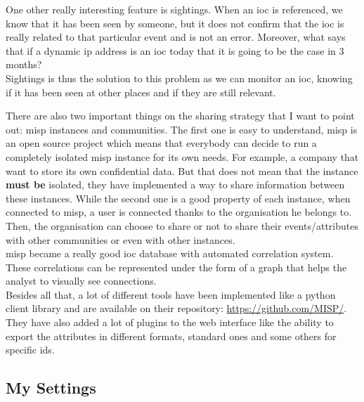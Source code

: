 \documentclass{eplmastersthesis}
\begin{document}
One other really interesting feature is sightings. When an \gls{ioc} is referenced, we know that it has been seen by someone, but it does not confirm that the \gls{ioc} is really related to that particular event and is not an error. Moreover, what says that if a dynamic \gls{ip} address is an \gls{ioc} today that it is going to be the case in 3 months? \\
Sightings is thus the solution to this problem as we can monitor an \gls{ioc}, knowing if it has been seen at other places and if they are still relevant.


There are also two important things on the sharing strategy that I want to point out: \gls{misp} instances and communities. The first one is easy to understand, \gls{misp} is an open source project which means that everybody can decide to run a completely isolated \gls{misp} instance for its own needs. For example, a company that want to store its own confidential data. But that does not mean that the instance \textbf{must be} isolated, they have implemented a way to share information between these instances. While the second one is a good property of each instance, when connected to \gls{misp}, a user is connected thanks to the organisation he belongs to. Then, the organisation can choose to share or not to share their events/attributes with other communities or even with other instances. \\ 

\gls{misp} became a really good \gls{ioc} database with automated correlation system. These correlations can be represented under the form of a graph that helps the analyst to visually see connections.\\

Besides all that, a lot of different tools have been implemented like a python client library and are available on their repository: \url{https://github.com/MISP/}.\\
They have also added a lot of plugins to the web interface like the ability to export the attributes in different formats, standard ones and some others for specific \gls{ids}.\\

\subsection{My Settings}
\end{document}
